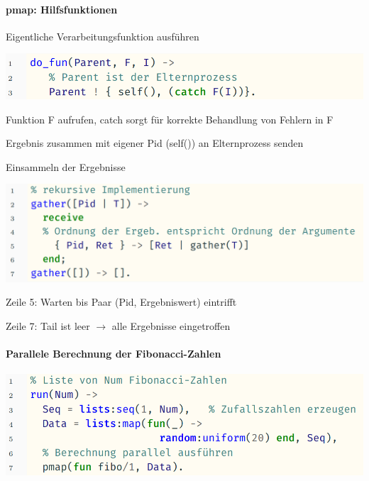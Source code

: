 \documentclass[10pt]{article}
\begin{document}
  \paragraph{pmap: Hilfsfunktionen}
  
  \color{orange} Eigentliche Verarbeitungsfunktion ausführen \color{black}
  \begin{center}
    \includegraphics[width=0.4\linewidth]{Assets/Programmierparadigmen-code-snippet-05}
  \end{center}
  \begin{itemize*}
    \item Funktion F aufrufen, catch sorgt für korrekte Behandlung von Fehlern in F
    \item Ergebnis zusammen mit eigener Pid (self()) an Elternprozess senden
  \end{itemize*}
  
  \color{orange} Einsammeln der Ergebnisse \color{black}
  \begin{center}
    \includegraphics[width=0.7\linewidth]{Assets/Programmierparadigmen-code-snippet-06}
  \end{center}
  \begin{itemize*}
    \item Zeile 5: Warten bis Paar (Pid, Ergebniswert) eintrifft
    \item Zeile 7: Tail ist leer $\rightarrow$ alle Ergebnisse eingetroffen
  \end{itemize*}
  
  \paragraph{Parallele Berechnung der Fibonacci-Zahlen}
  
  \begin{center}
    \includegraphics[width=0.4\linewidth]{Assets/Programmierparadigmen-code-snippet-07}
  \end{center}
  
\end{document}
